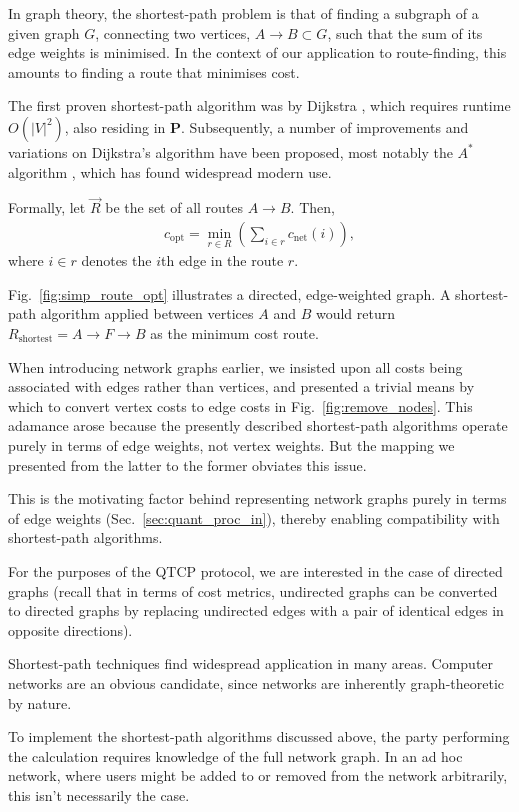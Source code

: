 \documentclass[aps,rmp,twocolumn,amsmath,amssymb,nofootinbib,superscriptaddress,longbibliography,floatfix,table-of-contents,eqsecnum]{revtex4-1}
\begin{document}
In graph theory, the shortest-path problem is that of finding a subgraph of a given graph $G$, connecting two vertices, \mbox{$A\to B \subset G$}, such that the sum of its edge weights is minimised. In the context of our application to route-finding, this amounts to finding a route that minimises cost.

The first proven shortest-path algorithm was by Dijkstra \cite{bib:Dijkstra59}, which requires runtime $O(|V|^2)$, also residing in \textbf{P}. Subsequently, a number of improvements and variations on Dijkstra's algorithm have been proposed, most notably the $A^*$ algorithm \cite{???}, which has found widespread modern use.

Formally, let $\vec{R}$ be the set of all routes \mbox{$A\to B$}. Then,
\begin{align}
c_\text{opt} = \min_{r\in R} \left(\sum_{i\in r} c_\text{net}(i) \right),
\end{align}
where \mbox{$i\in r$} denotes the $i$th edge in the route $r$.

Fig.~\ref{fig:simp_route_opt} illustrates a directed, edge-weighted graph. A shortest-path algorithm applied between vertices $A$ and $B$ would return \mbox{$R_\text{shortest} = A\to F\to B$} as the minimum cost route.

When introducing network graphs earlier, we insisted upon all costs being associated with edges rather than vertices, and presented a trivial means by which to convert vertex costs to edge costs in Fig.~\ref{fig:remove_nodes}. This adamance arose because the presently described shortest-path algorithms operate purely in terms of edge weights, not vertex weights. But the mapping we presented from the latter to the former obviates this issue.

This is the motivating factor behind representing network graphs purely in terms of edge weights (Sec.~\ref{sec:quant_proc_in}), thereby enabling compatibility with shortest-path algorithms.

For the purposes of the QTCP protocol, we are interested in the case of directed graphs (recall that in terms of cost metrics, undirected graphs can be converted to directed graphs by replacing undirected edges with a pair of identical edges in opposite directions).

Shortest-path techniques find widespread application in many areas. Computer networks are an obvious candidate, since networks are inherently graph-theoretic by nature.

To implement the shortest-path algorithms discussed above, the party performing the calculation requires knowledge of the full network graph. In an ad hoc network, where users might be added to or removed from the network arbitrarily, this isn't necessarily the case.
\end{document}
